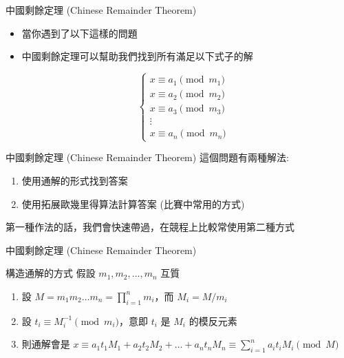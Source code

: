 \documentclass[aspectratio=169]{beamer}
\begin{document}
    \begin{frame}{中國剩餘定理 (Chinese Remainder Theorem)}
        \begin{itemize}
            \item 當你遇到了以下這樣的問題
            \item 中國剩餘定理可以幫助我們找到所有滿足以下式子的解
        \end{itemize}
        \begin{equation*}
            \quad \left\{ \begin{matrix} x \equiv a_1 \pmod {m_1} \\ x \equiv a_2 \pmod {m_2} \\ x \equiv a_3 \pmod {m_3} \\ \vdots \\ x \equiv a_n \pmod {m_n} \end{matrix} \right.
        \end{equation*}
    \end{frame}
    
    \begin{frame}{中國剩餘定理 (Chinese Remainder Theorem)}
        這個問題有兩種解法:
        \begin{enumerate}
            \item 使用通解的形式找到答案
            \item 使用拓展歐幾里得算法計算答案 (比賽中常用的方式)
        \end{enumerate}
        第一種作法的話，我們會快速帶過，在競程上比較常使用第二種方式
    \end{frame}
    
    \begin{frame}{中國剩餘定理 (Chinese Remainder Theorem)}
        \begin{alertblock}{構造通解的方式}
            假設 $m_1, m_2, \dots, m_n$ 互質
            \begin{enumerate}
                \item 設 $M = m_1 m_2 \dots m_n = \prod_{i=1}^n m_i$，而 $M_i = M/m_i$
                \item 設 $t_i \equiv M_i^{-1} \pmod{m_i}$，意即 $t_i$ 是 $M_i$ 的模反元素  
                \item 則通解會是 $x \equiv a_1t_1M_1 + a_2t_2M_2 + \dots + a_n t_n M_n \equiv \sum_{i=1}^n a_i t_i M_i \pmod M$
            \end{enumerate}
        \end{alertblock}
    \end{frame}
    
\end{document}
